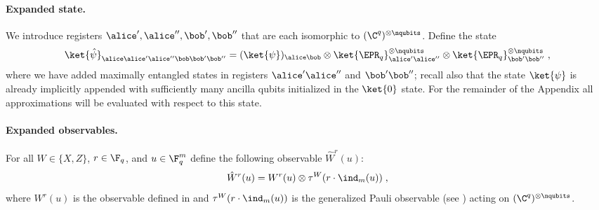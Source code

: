 \paragraph{Expanded state.} We introduce registers $\alice', \alice'', \bob', \bob''$ that are each isomorphic to $(\C^q)^{\otimes \nqubits}$. Define the state \begin{equation}\label{eq:def-psihat}
	\ket{\hat{\psi}}_{\alice \alice' \alice'' \bob \bob' \bob''} = (\ket{\psi})_{\alice \bob} \otimes \ket{\EPR_q}^{\otimes \nqubits}_{\alice' \alice''} \otimes \ket{\EPR_q}^{\otimes \nqubits}_{\bob' \bob''}\;,
\end{equation}
where we have added maximally entangled states in registers
$\alice' \alice''$ and $\bob' \bob''$; recall also that the state $\ket{\psi}$ is already implicitly  appended with sufficiently many ancilla qubits initialized in the $\ket{0}$ state. 
For the remainder of the Appendix all approximations will be evaluated with respect to this state.

\paragraph{Expanded observables.} For all $W \in \{X,Z\}$, $r \in \F_q$, and $u \in \F_q^m$ define the following observable $\hat{W}^r(u)$: \begin{equation}\label{eq:lc-23}
	\hat{W}^r(u) = W^r(u) \otimes \tau^W(r \cdot \ind_m(u))\;,
\end{equation}
where $W^r(u)$ is the observable defined in  and $\tau^W(r \cdot \ind_m(u))$ is the generalized Pauli observable (see ) acting on $(\C^q)^{\otimes \nqubits}$. 

